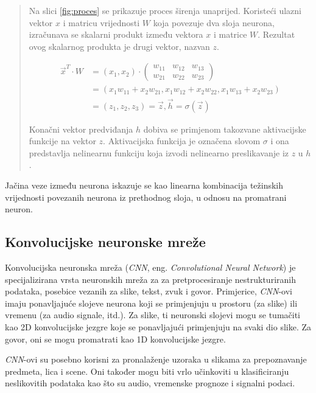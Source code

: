 \documentclass[]{foi} %
\begin{document}
\newpage
\blockquote[{\cite{builtin1}}]{Na slici \ref{fig:proces} se prikazuje proces širenja unaprijed. Koristeći ulazni vektor $x$ i matricu vrijednosti $W$ koja povezuje dva sloja neurona, izračunava se skalarni produkt između vektora $x$ i matrice $W$.
Rezultat ovog skalarnog produkta je drugi vektor, nazvan $z$.

\[
\begin{aligned}
\vec{x}^T \cdot W &=\left(x_1, x_2\right) \cdot\left(\begin{array}{lll}
w_{11} & w_{12} & w_{13} \\
w_{21} & w_{22} & w_{23}
\end{array}\right) \\
&=\left(x_1 w_{11}+x_2 w_{21}, x_1 w_{12}+x_2 w_{22}, x_1 w_{13}+x_2 w_{23}\right) \\
&=\left(z_1, z_2, z_3\right)=\vec{z}, \vec{h}=\sigma(\vec{z})
\end{aligned}
\]

Konačni vektor predviđanja $h$ dobiva se primjenom takozvane aktivacijske funkcije na vektor $z$. Aktivacijska funkcija je označena slovom $\sigma$ i ona predstavlja nelinearnu funkciju koja izvodi nelinearno preslikavanje iz $z$ u $h$.}
Jačina veze \cite{builtin1} između neurona iskazuje se kao linearna kombinacija težinskih vrijednosti povezanih neurona iz prethodnog sloja, u odnosu na promatrani neuron.

\subsection{Konvolucijske neuronske mreže}

Konvolucijska neuronska mreža (\textit{CNN}, eng. \textit{Convolutional Neural Network}) \cite[str. 326]{deep} je specijalizirana vrsta neuronskih mreža za za pretprocesiranje nestrukturiranih podataka, posebice vezanih za slike, tekst, zvuk i govor. Primjerice, \textit{CNN}-ovi imaju ponavljajuće slojeve neurona koji se primjenjuju u prostoru (za slike) ili vremenu (za audio signale, itd.). Za slike, ti neuronski slojevi mogu se tumačiti kao 2D konvolucijske jezgre koje se ponavljajući primjenjuju na svaki dio slike. Za govor, oni se mogu promatrati kao 1D konvolucijske jezgre.

\textit{CNN}-ovi su posebno korisni za pronalaženje uzoraka u slikama za prepoznavanje predmeta, lica i scene. Oni također mogu biti vrlo učinkoviti u klasificiranju neslikovitih podataka kao što su audio, vremenske prognoze i signalni podaci.
\end{document}
